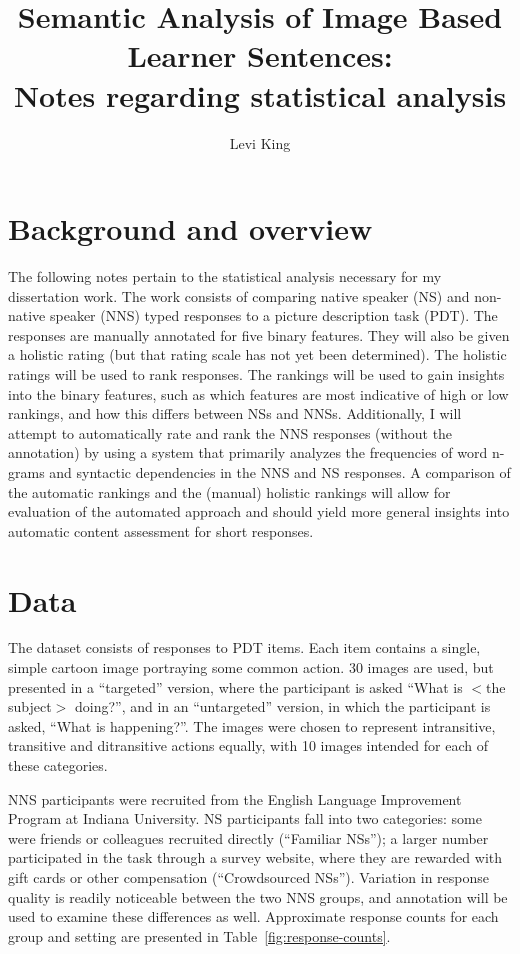 \documentclass[11pt]{article}
\title{Semantic Analysis of Image Based Learner Sentences:\\ Notes regarding statistical analysis}
\author{Levi King}
\begin{document}
\maketitle

\section{Background and overview}

The following notes pertain to the statistical analysis necessary for my dissertation work. The work consists of comparing native speaker (NS) and non-native speaker (NNS) typed responses to a picture description task (PDT). The responses are manually annotated for five binary features. They will also be given a holistic rating (but that rating scale has not yet been determined). The holistic ratings will be used to rank responses. The rankings will be used to gain insights into the binary features, such as which features are most indicative of high or low rankings, and how this differs between NSs and NNSs. Additionally, I will attempt to automatically rate and rank the NNS responses (without the annotation) by using a system that primarily analyzes the frequencies of word n-grams and syntactic dependencies in the NNS and NS responses. A comparison of the automatic rankings and the (manual) holistic rankings will allow for evaluation of the automated approach and should yield more general insights into automatic content assessment for short responses.

\section{Data}
The dataset consists of responses to PDT items. Each item contains a single, simple cartoon image portraying some common action. 30 images are used, but presented in a ``targeted'' version, where the participant is asked ``What is $<$the subject$>$ doing?'', and in an ``untargeted'' version, in which the participant is asked, ``What is happening?''. The images were chosen to represent intransitive, transitive and ditransitive actions equally, with 10 images intended for each of these categories.

NNS participants were recruited from the English Language Improvement Program at Indiana University. NS participants fall into two categories: some were friends or colleagues recruited directly (``Familiar NSs''); a larger number participated in the task through a survey website, where they are rewarded with gift cards or other compensation (``Crowdsourced NSs''). Variation in response quality is readily noticeable between the two NNS groups, and annotation will be used to examine these differences as well. Approximate response counts for each group and setting are presented in Table~\ref{fig:response-counts}.
\end{document}
